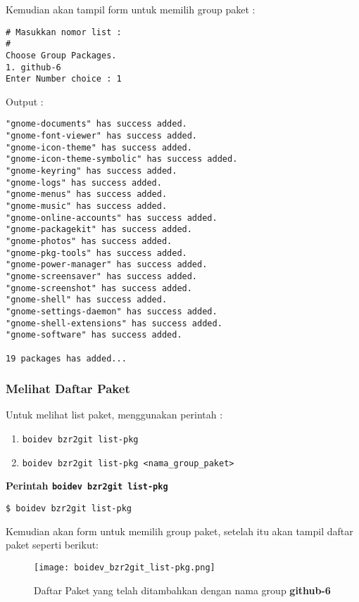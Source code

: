 {\noindent
Kemudian akan tampil form untuk memilih group paket :

\begin{lstlisting}[language=ShellBash]
# Masukkan nomor list :
#
Choose Group Packages.
1. github-6
Enter Number choice : 1
\end{lstlisting}

\noindent
Output :

\begin{lstlisting}[language=ShellBash]
"gnome-documents" has success added.
"gnome-font-viewer" has success added.
"gnome-icon-theme" has success added.
"gnome-icon-theme-symbolic" has success added.
"gnome-keyring" has success added.
"gnome-logs" has success added.
"gnome-menus" has success added.
"gnome-music" has success added.
"gnome-online-accounts" has success added.
"gnome-packagekit" has success added.
"gnome-photos" has success added.
"gnome-pkg-tools" has success added.
"gnome-power-manager" has success added.
"gnome-screensaver" has success added.
"gnome-screenshot" has success added.
"gnome-shell" has success added.
"gnome-settings-daemon" has success added.
"gnome-shell-extensions" has success added.
"gnome-software" has success added.

19 packages has added...

\end{lstlisting}

\subsubsection{Melihat Daftar Paket}
\noindent
Untuk melihat list paket, menggunakan perintah : 
\begin{enumerate}
	\item {\small \texttt{boidev bzr2git list-pkg}}
	\item {\small \texttt{boidev bzr2git list-pkg <nama\_group\_paket>}}
\end{enumerate}

\noindent
\textbf{Perintah {\small \texttt{boidev bzr2git list-pkg}}}

\begin{lstlisting}[language=ShellBash]
$ boidev bzr2git list-pkg
\end{lstlisting}

\noindent
Kemudian akan form untuk memilih group paket, setelah itu akan tampil daftar paket seperti berikut:

\begin{figure}[H]
	\centering
	\texttt{[image: boidev\_bzr2git\_list-pkg.png]}
	\caption{Daftar Paket yang telah ditambahkan dengan nama group \textbf{github-6}}
	\label{fig:bab2_list-pkg}
\end{figure}

}
